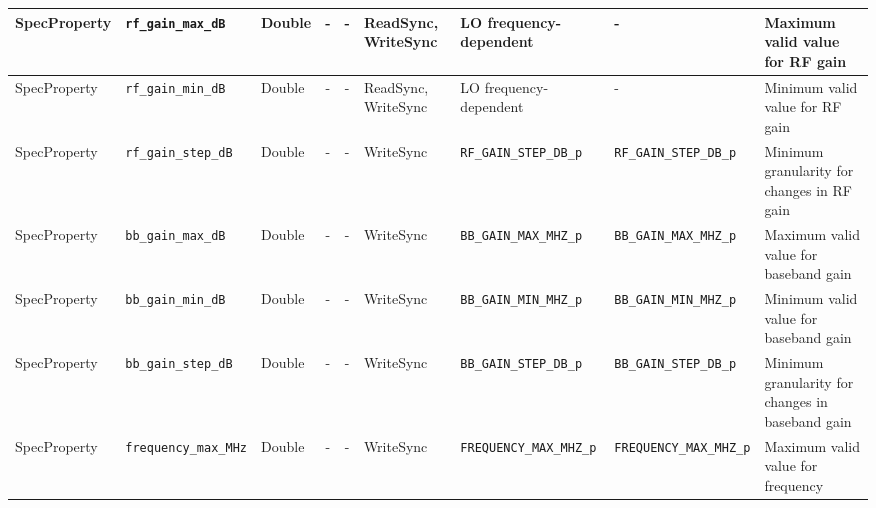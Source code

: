 \begin{landscape}
\begin{scriptsize}
\begin{longtable}{|p{1.8cm}|p{4.1cm}|p{1cm}|c|c|p{1.6cm}|p{3.7cm}|p{3.7cm}|p{2.5cm}|}
			\hline
			SpecProperty & \verb+rf_gain_max_dB+               & Double& -        & -          & ReadSync, WriteSync & LO frequency-dependent & - & Maximum valid value for RF gain                                                                                                                                                                                             \\
			\hline
			SpecProperty & \verb+rf_gain_min_dB+               & Double& -        & -          & ReadSync, WriteSync & LO frequency-dependent & - & Minimum valid value for RF gain                                                                                                                                                                                             \\
			\hline
			SpecProperty & \verb+rf_gain_step_dB+              & Double& -        & -          & WriteSync      & \verb+RF_GAIN_STEP_DB_p+ & \verb+RF_GAIN_STEP_DB_p+ & Minimum granularity for changes in RF gain                                                                                                                                                                                  \\
			\hline
			SpecProperty & \verb+bb_gain_max_dB+               & Double& -        & -          & WriteSync      & \verb+BB_GAIN_MAX_MHZ_p+ & \verb+BB_GAIN_MAX_MHZ_p+ & Maximum valid value for baseband gain                                                                                                                                                                                       \\
			\hline
			SpecProperty & \verb+bb_gain_min_dB+               & Double& -        & -          & WriteSync      & \verb+BB_GAIN_MIN_MHZ_p+ & \verb+BB_GAIN_MIN_MHZ_p+ & Minimum valid value for baseband gain                                                                                                                                                                                       \\
			\hline
			SpecProperty & \verb+bb_gain_step_dB+              & Double& -        & -          & WriteSync      & \verb+BB_GAIN_STEP_DB_p+ & \verb+BB_GAIN_STEP_DB_p+ & Minimum granularity for changes in baseband gain                                                                                                                                                                            \\
			\hline
			SpecProperty & \verb+frequency_max_MHz+            & Double& -        & -          & WriteSync      & \verb+FREQUENCY_MAX_MHZ_p+ & \verb+FREQUENCY_MAX_MHZ_p+ & Maximum valid value for frequency                                                                                                                                                                                           \\

\end{longtable}
\end{scriptsize}
\end{landscape}
